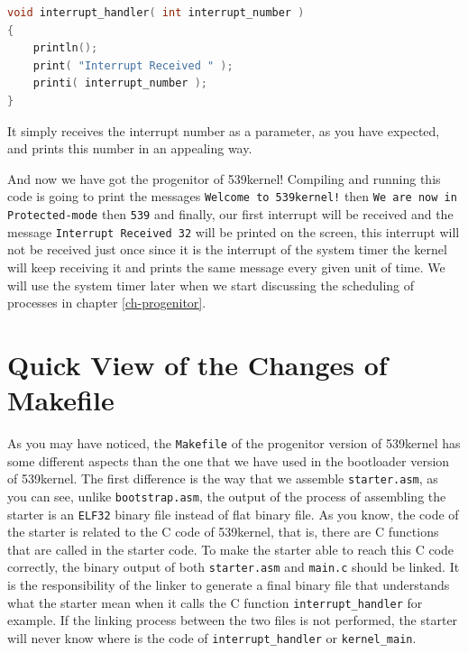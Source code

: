 \begin{lstlisting}[language=C]
void interrupt_handler( int interrupt_number )
{
    println();
    print( "Interrupt Received " );
    printi( interrupt_number );
}
\end{lstlisting}

It simply receives the interrupt number as a parameter, as you have
expected, and prints this number in an appealing way.

And now we have got the progenitor of 539kernel! Compiling and running
this code is going to print the messages
\lstinline"Welcome to 539kernel!" then
\lstinline!We are now in Protected-mode! then \lstinline!539! and
finally, our first interrupt will be received and the message
\lstinline!Interrupt Received 32! will be printed on the screen, this
interrupt will not be received just once since it is the interrupt of
the system timer the kernel will keep receiving it and prints the same
message every given unit of time. We will use the system timer later
when we start discussing the scheduling of processes in chapter
\ref{ch-progenitor}.

\section{Quick View of the Changes of
Makefile}\label{quick-view-of-the-changes-of-makefile}

As you may have noticed, the \lstinline!Makefile! of the progenitor
version of 539kernel has some different aspects than the one that we
have used in the bootloader version of 539kernel. The first difference
is the way that we assemble \lstinline!starter.asm!, as you can see,
unlike \lstinline!bootstrap.asm!, the output of the process of
assembling the starter is an \lstinline!ELF32! binary file instead of
flat binary file. As you know, the code of the starter is related to the
C code of 539kernel, that is, there are C functions that are called in
the starter code. To make the starter able to reach this C code
correctly, the binary output of both \lstinline!starter.asm! and
\lstinline!main.c! should be linked. It is the responsibility of the
linker to generate a final binary file that understands what the starter
mean when it calls the C function \lstinline!interrupt_handler! for
example. If the linking process between the two files is not performed,
the starter will never know where is the code of
\lstinline!interrupt_handler! or \lstinline!kernel_main!.

